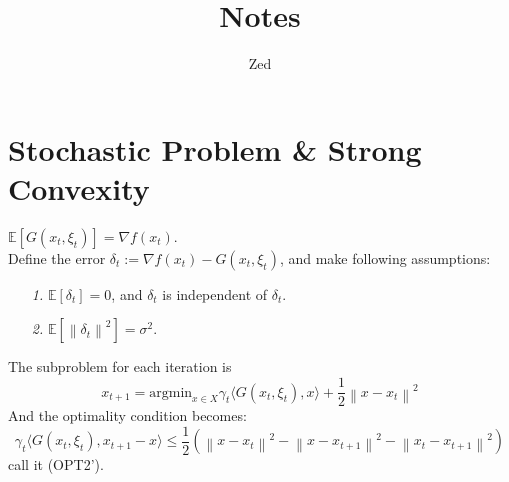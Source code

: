 \documentclass[a4paper, 11pt]{article}
\title{Notes}
\author{Zed}
\begin{document}
\maketitle
\section{Stochastic Problem \& Strong Convexity}
$\mathbb{E}\left[G(x_t, \xi_t)\right] = \nabla f(x_t)$.\\
Define the error $\delta_t:= \nabla f(x_t) - G(x_t, \xi_t)$, and make following assumptions:
\begin{itemize}
  \item[\textit{1.}] $\mathbb{E}\left[\delta_t\right] = 0$, and $\delta_t$ is independent of $\delta_t$.
  \item[\textit{2.}] $\mathbb{E}\left[\left\|\delta_t\right\|^2\right] =\sigma^2$.
\end{itemize}
The subproblem for each iteration is 
$$
x_{t+1} = \text{argmin}_{x\in X} \gamma_t \langle G(x_t, \xi_t), x \rangle + \frac{1}{2} \left\|x-x_t\right\|^2 
$$
And the optimality condition becomes:
$$
\gamma_t \langle G(x_t, \xi_t), x_{t+1}-x \rangle \leq \frac{1}{2} \left(\left\|x-x_t\right\|^2 -\left\|x-x_{t+1}\right\|^2 -\left\|x_t-x_{t+1}\right\|^2 \right)
$$
call it (OPT2').
\end{document}
